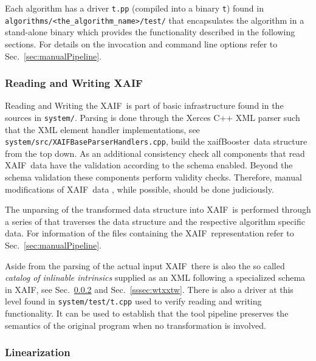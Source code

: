\documentclass{book}
\newcommand{\xaif}{XAIF}
\newcommand{\xaifBooster}{xaifBooster}
\newcommand{\code}[1]{{\small\tt{#1}}}
\newcommand{\refsec}[1]{{Sec.~\ref{#1}}}
\begin{document}
Each algorithm has a driver \code{t.pp} (compiled into a binary \code{t}) 
found in \code{algorithms/<the\_algorithm\_name>/test/} 
that encapsulates the algorithm 
in a stand-alone binary which provides the functionality described 
in the following 
sections. For details on the invocation and command line options refer to 
\refsec{sec:manualPipeline}.

\subsubsection{Reading and Writing \xaif}\label{ssssec:readWriteXaif}
Reading and Writing the \xaif\ is part of basic infrastructure
found in the sources in \code{system/}.
Parsing is done through the Xerces C++ XML parser \cite{xercesWeb}
such that the XML element handler implementations, see \code{system/src/XAIFBaseParserHandlers.cpp},
build the \xaifBooster\ data 
structure from the top down. 
As an additional consistency check all components that read \xaif\ data 
have the validation according to the schema enabled. Beyond the schema 
validation these components perform validity checks. Therefore, 
manual modifications of \xaif\ data , while possible, should 
be done judiciously. 

The unparsing of the transformed data structure into \xaif\ is performed 
through a series of that traverses the data structure and the 
respective algorithm specific data. 
For information of the files containing the \xaif\ representation refer to 
\refsec{sec:manualPipeline}.

Aside from the parsing of the actual input \xaif\ there is also the so called 
{\em 
  catalog of inlinable intrinsics
} 
supplied as an XML following a specialized schema in \xaif, see  
\refsec{sssec:linearization} and \refsec{sssec:wtxxtw}.
There is also a driver at this level found in \code{system/test/t.cpp} used 
to verify reading and writing functionality. It can be used to establish 
that the tool pipeline preserves the semantics of the original program when 
no transformation is involved. 

\subsubsection{Linearization}\label{sssec:linearization}
\end{document}
